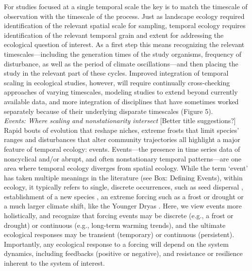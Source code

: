 \documentclass[11pt,a4paper,oneside]{article}
\begin{document}
For studies focused at a single temporal scale the key is to match the timescale of observation with the timescale of the process. Just as landscape ecology required identification of the relevant spatial scale for sampling, temporal ecology requires identification of the relevant temporal grain and extent for addressing the ecological question of interest. As a first step this means recognizing the relevant timescales---including the generation times of the study organisms, frequency of disturbance, as well as the period of climate oscillations---and then placing the study in the relevant part of these cycles. Improved integration of temporal scaling in ecological studies, however, will require continually cross-checking approaches of varying timescales, modeling studies to extend beyond currently available data, and more integration of disciplines that have sometimes worked separately because of their underlying disparate timescales (Figure 5). \\

\noindent \emph{Events: Where scaling and nonstationarity intersect} [Better title suggestions?]\\
Rapid bouts of evolution that reshape niches, extreme frosts that limit species' ranges and disturbances that alter community trajectories all highlight a major feature of temporal ecology: events. Events---the presence in time series data of noncyclical and/or abrupt, and often nonstationary temporal patterns---are one area where temporal ecology diverges from spatial ecology. While the term `event' has taken multiple meanings in the literature (see Box: Defining Events), within ecology, it typically refers to single, discrete occurrences, such as seed dispersal \citep{Higgins2003}, establishment of a new species \citep{Blackburn2011}, an extreme forcing such as a frost or drought \citep{Jentsch:2009ff} or a much larger climate shift, like the Younger Dryas \citep{Jackson:2009el}. Here, we view events more holistically, and recognize that forcing events may be discrete (e.g., a frost or drought) or continuous (e.g., long-term warming trends), and the ultimate ecological responses may be transient (temporary) or continuous (persistent). Importantly, any ecological response to a forcing will depend on the system dynamics, including feedbacks (positive or negative), and resistance or resilience inherent to the system of interest. 
\end{document}
